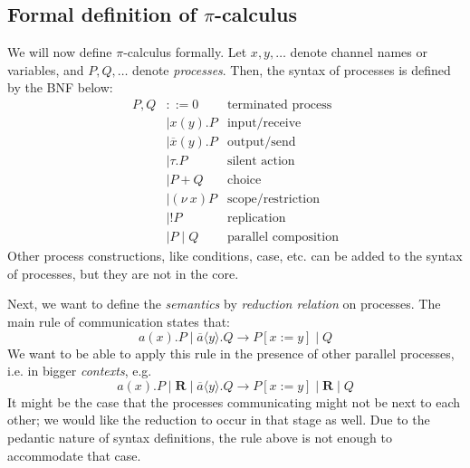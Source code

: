 \documentclass[a4paper, openany]{memoir}
\theoremstyle{definition}
\begin{document}
    \subsection{Formal definition of $\pi$-calculus}
    We will now define $\pi$-calculus formally. Let $x, y, \dots$ denote channel names or variables, and $P, Q, \dots$ denote \emph{processes}. Then, the syntax of processes is defined by the BNF below:
    \begin{align*}
        P, Q &::= 0 & \textrm{terminated process} \\
        &\mid x(y).P & \textrm{input/receive} \\
        &\mid \overline{x}(y).P & \textrm{output/send} \\
        &\mid \tau.P & \textrm{silent action} \\
        &\mid P + Q & \textrm{choice} \\
        &\mid (\nu \ x) P & \textrm{scope/restriction} \\
        &\mid {!P} & \textrm{replication} \\
        &\mid P \mid Q & \textrm{parallel composition}
    \end{align*}
    Other process constructions, like conditions, case, etc. can be added to the syntax of processes, but they are not in the core.

    Next, we want to define the \emph{semantics} by \emph{reduction relation} on processes. The main rule of communication states that:
    \[a(x).P \mid \overline{a} \langle y \rangle.Q \to P[x := y] \mid Q\]
    We want to be able to apply this rule in the presence of other parallel processes, i.e. in bigger \emph{contexts}, e.g.
    \[a(x).P \mid \textbf{R} \mid \overline{a} \langle y \rangle.Q \to P[x := y] \mid \textbf{R} \mid Q\]
    It might be the case that the processes communicating might not be next to each other; we would like the reduction to occur in that stage as well. Due to the pedantic nature of syntax definitions, the rule above is not enough to accommodate that case.
\end{document}
